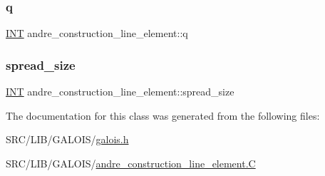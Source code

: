 \subsubsection{\texorpdfstring{q}{q}}
{\footnotesize\ttfamily \mbox{\hyperlink{galois_8h_a09fddde158a3a20bd2dcadb609de11dc}{I\+NT}} andre\+\_\+construction\+\_\+line\+\_\+element\+::q}

\mbox{\label{classandre__construction__line__element_ac1f8cdd51348d3a1771500249b12bbc3}} 
\subsubsection{\texorpdfstring{spread\+\_\+size}{spread\_size}}
{\footnotesize\ttfamily \mbox{\hyperlink{galois_8h_a09fddde158a3a20bd2dcadb609de11dc}{I\+NT}} andre\+\_\+construction\+\_\+line\+\_\+element\+::spread\+\_\+size}



The documentation for this class was generated from the following files\+:\begin{DoxyCompactItemize}
\item 
S\+R\+C/\+L\+I\+B/\+G\+A\+L\+O\+I\+S/\mbox{\hyperlink{galois_8h}{galois.\+h}}\item 
S\+R\+C/\+L\+I\+B/\+G\+A\+L\+O\+I\+S/\mbox{\hyperlink{andre__construction__line__element_8_c}{andre\+\_\+construction\+\_\+line\+\_\+element.\+C}}\end{DoxyCompactItemize}
